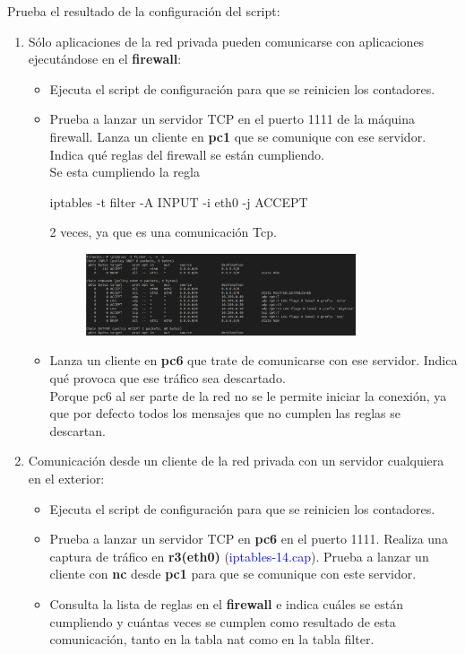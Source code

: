 \documentclass[12pt, a4paper]{report}
\begin{document}
Prueba el resultado de la configuración del script:
\begin{enumerate}
	\item Sólo aplicaciones de la red privada pueden comunicarse con aplicaciones ejecutándose en el
	\textbf{firewall}:
	\begin{itemize}
		\item Ejecuta el script de configuración para que se reinicien los contadores.
		\item Prueba a lanzar un servidor TCP en el puerto 1111 de la máquina firewall. Lanza un cliente
		en \textbf{pc1} que se comunique con ese servidor. Indica qué reglas del firewall se están cumpliendo.\\
		
		Se esta cumpliendo la regla 
		\begin{center}
			iptables -t filter -A INPUT -i eth0 -j ACCEPT
		\end{center}
		2 veces, ya que es una comunicación Tcp.
		\begin{figure}[h]
			\centering
			\includegraphics[width=0.8\textwidth]{ej3_1}
		\end{figure}
		\item Lanza un cliente en \textbf{pc6} que trate de comunicarse con ese servidor. Indica qué provoca que
		ese tráfico sea descartado.\\
		
		Porque pc6 al ser parte de la red no se le permite iniciar la conexión, ya que por defecto todos los mensajes que no cumplen las reglas se descartan.
	\end{itemize}
	\item Comunicación desde un cliente de la red privada con un servidor cualquiera en el exterior:
	\begin{itemize}
		\item Ejecuta el script de configuración para que se reinicien los contadores.
		\item Prueba a lanzar un servidor TCP en \textbf{pc6} en el puerto 1111. Realiza una captura de tráfico
		en \textbf{r3(eth0)} (\textcolor{blue}{iptables-14.cap}). Prueba a lanzar un cliente con \textbf{nc} desde \textbf{pc1} para que se
		comunique con este servidor.
		\item Consulta la lista de reglas en el \textbf{firewall} e indica cuáles se están cumpliendo y cuántas
		veces se cumplen como resultado de esta comunicación, tanto en la tabla nat como en la
		tabla filter.\\
				

\end{itemize}
\end{enumerate}
\end{document}
